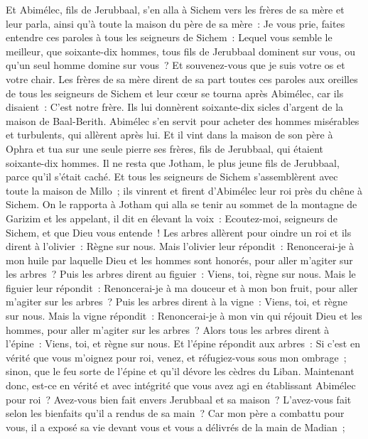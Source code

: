\begin{multicols}{2}
\VerseOne{}Et Abimélec, fils de Jerubbaal, s'en alla à Sichem vers les frères de sa mère et leur parla, ainsi qu'à toute la maison du père de sa mère~:
Je vous prie, faites entendre ces paroles à tous les seigneurs de Sichem~: Lequel vous semble le meilleur, que soixante-dix hommes, tous fils de Jerubbaal dominent sur vous, ou qu'un seul homme domine sur vous~? Et souvenez-vous que je suis votre os et votre chair.
Les frères de sa mère dirent de sa part toutes ces paroles aux oreilles de tous les seigneurs de Sichem et leur cœur se tourna après Abimélec, car ils disaient~: C'est notre frère.
Ils lui donnèrent soixante-dix sicles d'argent de la maison de Baal-Berith. Abimélec s'en servit pour acheter des hommes misérables et turbulents, qui allèrent après lui.
Et il vint dans la maison de son père à Ophra et tua sur une seule pierre ses frères, fils de Jerubbaal, qui étaient soixante-dix hommes. Il ne resta que Jotham, le plus jeune fils de Jerubbaal, parce qu'il s'était caché.
Et tous les seigneurs de Sichem s'assemblèrent avec toute la maison de Millo~; ils vinrent et firent d'Abimélec leur roi près du chêne à Sichem.
On le rapporta à Jotham qui alla se tenir au sommet de la montagne de Garizim et les appelant, il dit en élevant la voix~: Ecoutez-moi, seigneurs de Sichem, et que Dieu vous entende~!
Les arbres allèrent pour oindre un roi et ils dirent à l'olivier~: Règne sur nous.
Mais l'olivier leur répondit~: Renoncerai-je à mon huile par laquelle Dieu et les hommes sont honorés, pour aller m'agiter sur les arbres~?
Puis les arbres dirent au figuier~: Viens, toi, règne sur nous.
Mais le figuier leur répondit~: Renoncerai-je à ma douceur et à mon bon fruit, pour aller m'agiter sur les arbres~?
Puis les arbres dirent à la vigne~: Viens, toi, et règne sur nous.
Mais la vigne répondit~: Renoncerai-je à mon vin qui réjouit Dieu et les hommes, pour aller m'agiter sur les arbres~?
Alors tous les arbres dirent à l'épine~: Viens, toi, et règne sur nous.
Et l'épine répondit aux arbres~: Si c'est en vérité que vous m'oignez pour roi, venez, et réfugiez-vous sous mon ombrage~; sinon, que le feu sorte de l'épine et qu'il dévore les cèdres du Liban.
Maintenant donc, est-ce en vérité et avec intégrité que vous avez agi en établissant Abimélec pour roi~? Avez-vous bien fait envers Jerubbaal et sa maison~? L'avez-vous fait selon les bienfaits qu'il a rendus de sa main~?
Car mon père a combattu pour vous, il a exposé sa vie devant vous et vous a délivrés de la main de Madian~;

\end{multicols}
